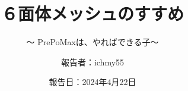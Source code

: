 %
\title{６面体メッシュのすすめ}
\subtitle{～ PrePoMaxは、やればできる子～}
%
%
%
\date[Apr.22nd,2024]{報告日：2024年4月22日}
\author[ichmy55]{報告者：ichmy55}
\subject{Usage example of PrePoMax}
